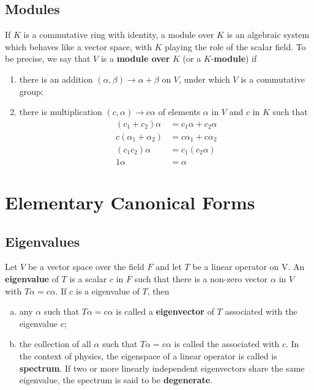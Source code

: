 \documentclass[main.tex]{subfiles}
\begin{document}
\section{Modules}
\begin{definition}
If $K$ is a commutative ring with identity, a module over $K$ is an algebraic system which behaves like a vector space, with $K$ playing the role of the scalar field. To be precise, we say that $V$ is a \textbf{module over} $K$ (or a $K$-\textbf{module}) if 
\begin{enumerate}
    \item there is an addition $(\alpha, \beta) \rightarrow \alpha + \beta$ on $V$, under which $V$ is a commutative group;
    \item there is multiplication $(c, \alpha) \rightarrow c\alpha$ of elements $\alpha$ in $V$ and $c$ in $K$ such that
    \begin{align*}
        (c_1 + c_2) \alpha &= c_1 \alpha + c_2 \alpha\\
        c(\alpha_1 + \alpha_2) &= c\alpha_1 + c\alpha_2\\
        (c_1 c_2)\alpha &= c_1(c_2 \alpha)\\
        1 \alpha &= \alpha
    \end{align*}
\end{enumerate}
\end{definition}
\chapter{Elementary Canonical Forms}
\section{Eigenvalues}
\begin{definition}
    Let $V$ be a vector space over the field $F$ and let $T$ be a linear operator on V. An \textbf{eigenvalue} of $T$ is a scalar $c$ in $F$ such that there is a non-zero vector $\alpha$ in $V$ with $T \alpha=c \alpha$. If $c$ is a  eigenvalue of $T$, then
    \begin{enumerate}[(a)]
        \item any $\alpha$ such that $T \alpha=c \alpha$ is called a \textbf{eigenvector} of $T$ associated with the eigenvalue $c$;
        \item the collection of all $\alpha$ such that $T \alpha=c \alpha$ is called the  associated with $c$. In the context of physics, the eigenspace of a linear operator is called is \textbf{spectrum}. If two or more linearly independent eigenvectors share the same eigenvalue, the spectrum is said to be \textbf{degenerate}.
    \end{enumerate}


\end{definition}
\end{document}
